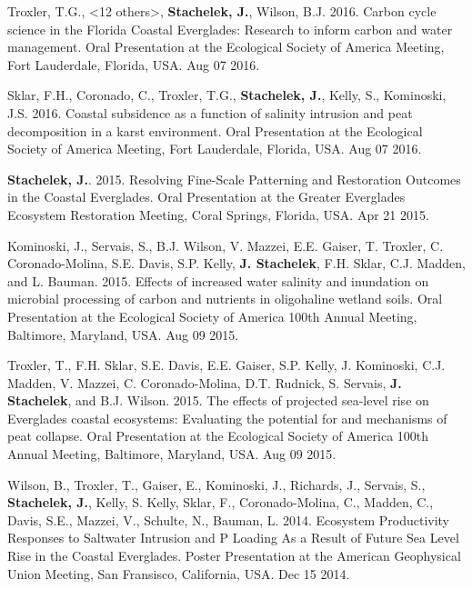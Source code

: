 \documentclass[11pt]{article}
\makeatletter
\newlength{\bibhang}
\newlength{\bibsep}
 {\@listi \global\bibsep\itemsep \global\advance\bibsep by\parsep}
\newenvironment{bibenum*}
  {\renewcommand\labelenumi{[\theenumi]}%
   \etaremune[
     topsep=0pt,
     itemsep=\bibsep,
     parsep=0pt,partopsep=0pt,
     itemindent=-\bibhang,
     leftmargin=0.8em
     ]
     }
  {\endetaremune}
\makeatother
\begin{document}
\begin{bibenum*}
    \item Troxler, T.G., <12 others>, \textbf{Stachelek, J.}, Wilson, B.J. 2016. Carbon cycle science in the Florida Coastal Everglades: Research to inform carbon and water management. Oral Presentation at the Ecological Society of America Meeting, Fort Lauderdale, Florida, USA. Aug 07 2016.
    \item Sklar, F.H., Coronado, C., Troxler, T.G., \textbf{Stachelek, J.}, Kelly, S., Kominoski, J.S. 2016. Coastal subsidence as a function of salinity intrusion and peat decomposition in a karst environment. Oral Presentation at the Ecological Society of America Meeting, Fort Lauderdale, Florida, USA. Aug 07 2016.
    \item \textbf{Stachelek, J.}. 2015. Resolving Fine-Scale Patterning and Restoration Outcomes in the Coastal Everglades. Oral Presentation at the Greater Everglades Ecosystem Restoration Meeting, Coral Springs, Florida, USA. Apr 21 2015. %
    \item Kominoski, J., Servais, S., B.J. Wilson, V. Mazzei, E.E. Gaiser, T. Troxler, C. Coronado-Molina, S.E. Davis, S.P. Kelly, \textbf{J. Stachelek}, F.H. Sklar, C.J. Madden, and L. Bauman. 2015. Effects of increased water salinity and inundation on microbial processing of carbon and nutrients in oligohaline wetland soils. Oral Presentation at the Ecological Society of America 100th Annual Meeting, Baltimore, Maryland, USA. Aug 09 2015.
    \item Troxler, T., F.H. Sklar, S.E. Davis, E.E. Gaiser, S.P. Kelly, J. Kominoski, C.J. Madden, V. Mazzei, C. Coronado-Molina, D.T. Rudnick, S. Servais, \textbf{J. Stachelek}, and B.J. Wilson. 2015. The effects of projected sea-level rise on Everglades coastal ecosystems: Evaluating the potential for and mechanisms of peat collapse. Oral Presentation at the Ecological Society of America 100th Annual Meeting, Baltimore, Maryland, USA. Aug 09 2015.
    \item Wilson, B., Troxler, T., Gaiser, E., Kominoski, J., Richards, J., Servais, S., \textbf{Stachelek, J.}, Kelly, S. Kelly, Sklar, F., Coronado-Molina, C., Madden, C., Davis, S.E., Mazzei, V., Schulte, N., Bauman, L. 2014. Ecosystem Productivity Responses to Saltwater Intrusion and P Loading As a Result of Future Sea Level Rise in the Coastal Everglades. Poster Presentation at the American Geophysical Union Meeting, San Fransisco, California, USA. Dec 15 2014.


\end{bibenum*}
\end{document}
